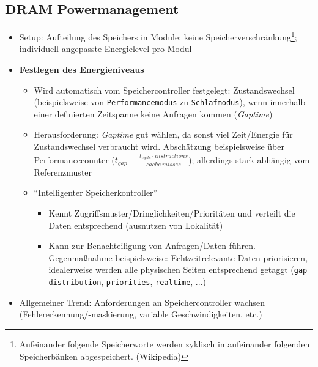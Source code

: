 \subsection{DRAM Powermanagement}
\begin{itemize}
	\item Setup: Aufteilung des Speichers in Module; keine Speicherverschränkung\footnote{Aufeinander folgende Speicherworte werden zyklisch in aufeinander folgenden Speicherbänken abgespeichert. (Wikipedia)}; individuell angepasste Energielevel pro Modul
	\item \textbf{Festlegen des Energieniveaus}
	\begin{itemize}
		\item Wird automatisch vom Speichercontroller festgelegt: Zustandswechsel (beispielsweise von \texttt{Performancemodus} zu \texttt{Schlafmodus}), wenn innerhalb einer definierten Zeitspanne keine Anfragen kommen (\textit{Gaptime})
		\item Herausforderung: \textit{Gaptime} gut wählen, da sonst viel Zeit/Energie für Zustandswechsel verbraucht wird. Abschätzung beispielsweise über Performancecounter (\(t_{gap}=\frac{t_{cycle} \cdot instructions}{cache~misses}\)); allerdings stark abhängig vom Referenzmuster
		\item "`Intelligenter Speicherkontroller"'
		\begin{itemize}
			\item Kennt Zugriffsmuster/Dringlichkeiten/Prioritäten und verteilt die Daten entsprechend (ausnutzen von Lokalität)
			\item Kann zur Benachteiligung von Anfragen/Daten führen. Gegenmaßnahme beispielsweise: Echtzeitrelevante Daten priorisieren, idealerweise werden alle physischen Seiten entsprechend getaggt (\texttt{gap distribution}, \texttt{priorities}, \texttt{realtime}, ...)
		\end{itemize}
	\end{itemize}
	\item Allgemeiner Trend: Anforderungen an Speichercontroller wachsen (Fehlererkennung/-maskierung, variable Geschwindigkeiten, etc.)
\end{itemize}


